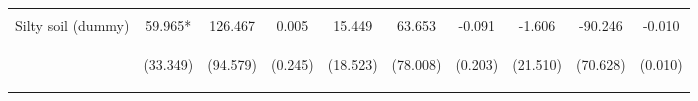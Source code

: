 \begin{center}
\begin{tabular}{lccccccccc}
\vspace{4pt} & \begin{footnotesize}[0.783]\end{footnotesize} & \begin{footnotesize}[0.847]\end{footnotesize} & \begin{footnotesize}[0.727]\end{footnotesize} & \begin{footnotesize}[0.957]\end{footnotesize} & \begin{footnotesize}[0.179]\end{footnotesize} & \begin{footnotesize}[0.502]\end{footnotesize} & \begin{footnotesize}[0.711]\end{footnotesize} & \begin{footnotesize}[0.086]\end{footnotesize} & \begin{footnotesize}[0.971]\end{footnotesize} \\
Silty soil (dummy) & 59.965* & 126.467 & 0.005 & 15.449 & 63.653 & -0.091 & -1.606 & -90.246 & -0.010 \\
 & \begin{footnotesize}(33.349)\end{footnotesize} & \begin{footnotesize}(94.579)\end{footnotesize} & \begin{footnotesize}(0.245)\end{footnotesize} & \begin{footnotesize}(18.523)\end{footnotesize} & \begin{footnotesize}(78.008)\end{footnotesize} & \begin{footnotesize}(0.203)\end{footnotesize} & \begin{footnotesize}(21.510)\end{footnotesize} & \begin{footnotesize}(70.628)\end{footnotesize} & \begin{footnotesize}(0.010)\end{footnotesize} \\

\end{tabular}
\end{center}
